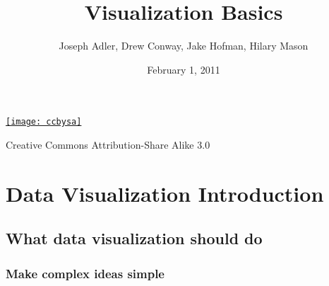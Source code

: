 \documentclass[xcolor=dvipsnames, 9pt]{beamer}
\title{Visualization Basics}
\author{Joseph Adler, Drew Conway, Jake Hofman, Hilary Mason}
\date{February 1, 2011}
\begin{document}
 
    
\begin{frame}[plain]
  \titlepage 

  \tiny
  \href{http://creativecommons.org/licenses/by-sa/3.0/us/}{\texttt{[image: ccbysa]}}

  Creative Commons Attribution-Share Alike 3.0
\end{frame}

\section{Data Visualization Introduction} %
\label{sec:visualization}

\subsection{What data visualization should do} %
\label{sub:what_data_visualization_should_do}

{
\begin{frame}[fragile]
    \frametitle{}
    \vspace{4cm}
    \begin{center}
        \begin{minipage}{5cm}
    \end{minipage}
    \end{center}
\end{frame}
}

\begin{frame}[fragile]
    \frametitle{Make complex ideas \textbf{simple}}
    \begin{center}
    \end{center}
\end{frame}
\end{document}
